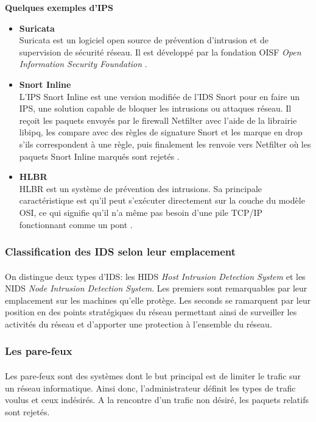     \textbf{Quelques exemples d'IPS \cite{e}}
    \begin{itemize}
      \item \textbf{Suricata}\\
	Suricata est un logiciel open source de prévention d'intrusion et de supervision de sécurité réseau. Il est développé par la fondation OISF \textit{Open Information Security Foundation} \cite{G}.

      \item \textbf{Snort Inline}\\
	L'IPS Snort Inline est une version modifiée de l'IDS Snort pour en faire un IPS, une solution capable de bloquer les intrusions ou attaques réseau. Il reçoit les paquets envoyés par le firewall Netfilter avec l'aide de la librairie libipq, les compare avec des règles de signature Snort et les marque en drop s'ils correspondent à une règle, puis finalement les renvoie vers Netfilter où les paquets Snort Inline marqués sont rejetés \cite{d}.

      \item \textbf{HLBR}\\
	HLBR est un système de prévention des intrusions. Sa principale caractéristique est qu'il peut s'exécuter directement sur la couche du modèle OSI, ce qui signifie qu'il n'a même pas besoin d'une pile TCP/IP fonctionnant comme un pont \cite{H}.
    \end{itemize}
    
    \subsubsection{Classification des IDS selon leur emplacement}
      \paragraph{}
	On distingue deux types d'IDS: les HIDS \textit{Host Intrusion Detection System} et les NIDS \textit{Node Intrusion Detection System}.
	Les premiers sont remarquables par leur emplacement sur les machines qu'elle protège. Les seconds se ramarquent par leur position en des points stratégiques du réseau permettant ainsi de surveiller les activités du réseau et d'apporter une protection à l'ensemble du réseau. 	  
			  
    \subsubsection{Les pare-feux}	   
      \paragraph{}
	Les pare-feux sont des systèmes dont le but principal est de limiter le trafic sur un réseau informatique. Ainsi donc, l'administrateur définit les types de trafic voulus et ceux indésirés. A la rencontre d'un trafic non désiré, les paquets relatifs sont rejetés.
	    
